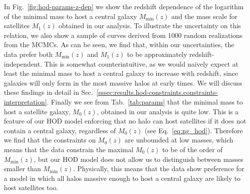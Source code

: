 \documentclass[a4paper,11pt]{article}
\begin{document}
In Fig.~\ref{fig:hod-params-z-dep} we show the redshift dependence of the logarithm of the minimal mass to host a central galaxy $M_{\mathrm{min}}(z)$ and the mass scale for satellites $M_{1}(z)$ obtained in our analysis. To illustrate the uncertainty on this relation, we also show a sample of curves derived from 1000 random realizations from the MCMCs. As can be seen, we find that, within our uncertainties, the data prefer both $M_{\mathrm{min}}(z)$ and $M_{1}(z)$ to be approximately redshift-independent. This is somewhat counterintuitive, as we would naively expect at least the minimal mass to host a central galaxy to increase with redshift, since galaxies will only form in the most massive halos at early times. We will discuss these findings in detail in Sec.~\ref{sssec:results.hod-constraints.constraints-interpretation}. Finally we see from Tab.~\ref{tab:params} that the minimal mass to host a satellite galaxy, $M_{0}(z)$, obtained in our analysis is quite low. This is a feature of our HOD model enforcing that no halo can host satellites if it does not contain a central galaxy, regardless of $M_{0}(z)$ (see Eq.~\ref{eq:ng_hod}). Therefore we find that the constraints on $M_{0}(z)$ are unbounded at low masses, which means that the data constrain the maximal $M_{0}(z)$ to be of the order of $M_{\mathrm{min}}(z)$, but our HOD model does not allow us to distinguish between masses smaller than $M_{\mathrm{min}}(z)$. Physically, this means that the data show preference for a model in which all halos massive enough to host a central galaxy are likely to host satellites too.
\end{document}
